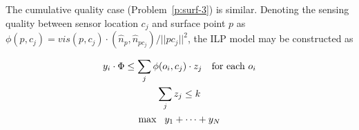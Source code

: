 
The cumulative quality case (Problem~\ref{p:surf-3}) is similar. Denoting the sensing
quality between sensor location $c_j$ and surface point $p$ 
as $\phi(p, c_j) = vis(p, c_j) \cdot (
\hat{n}_p, \hat{n}_{p c_j} )/||p c_j||^2$, the ILP model may be constructed as

\begin{gather}
    y_i \cdot \Phi  \leq \sum_{j} \phi(o_i, c_j)\cdot z_j   \text{\quad for each }o_i\\
    \sum_j z_j \leq k\\
    \max\ \ y_1 + \dots + y_N
\end{gather}


